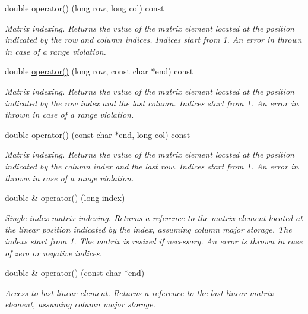 \begin{DoxyCompactItemize}
double \hyperlink{classDMatrix_a1e736f0992464a5d849ebbe5a4eb3bbf}{operator()} (long row, long col) const 
\begin{DoxyCompactList}\small\item\em Matrix indexing. Returns the value of the matrix element located at the position indicated by the row and column indices. Indices start from 1. An error in thrown in case of a range violation. \item\end{DoxyCompactList}\item 
double \hyperlink{classDMatrix_aafb023a91a09e10f3c95414b29a32d22}{operator()} (long row, const char $\ast$end) const 
\begin{DoxyCompactList}\small\item\em Matrix indexing. Returns the value of the matrix element located at the position indicated by the row index and the last column. Indices start from 1. An error in thrown in case of a range violation. \item\end{DoxyCompactList}\item 
double \hyperlink{classDMatrix_aca1e6c7d7c8859a705bc87674003a194}{operator()} (const char $\ast$end, long col) const 
\begin{DoxyCompactList}\small\item\em Matrix indexing. Returns the value of the matrix element located at the position indicated by the column index and the last row. Indices start from 1. An error in thrown in case of a range violation. \item\end{DoxyCompactList}\item 
double \& \hyperlink{classDMatrix_a6f6ad5489850d8200b6a49c9da098877}{operator()} (long index)
\begin{DoxyCompactList}\small\item\em Single index matrix indexing. Returns a reference to the matrix element located at the linear position indicated by the index, assuming column major storage. The indexs start from 1. The matrix is resized if necessary. An error is thrown in case of zero or negative indices. \item\end{DoxyCompactList}\item 
double \& \hyperlink{classDMatrix_a8a1118191a95c48e44043ddb89dbd826}{operator()} (const char $\ast$end)
\begin{DoxyCompactList}\small\item\em Access to last linear element. Returns a reference to the last linear matrix element, assuming column major storage. \item\end{DoxyCompactList}\item 

\end{DoxyCompactItemize}
